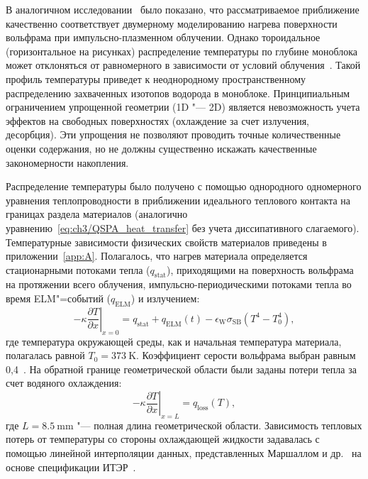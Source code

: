 В аналогичном исследовании~\cite{Dasgupta2023} было показано, что рассматриваемое приближение качественно соответствует двумерному моделированию нагрева поверхности вольфрама при импульсно-плазменном облучении. Однако тороидальное (горизонтальное на рисунках) распределение температуры по глубине моноблока может отклоняться от равномерного в зависимости от условий облучения~\cite{Delaporte-Mathurin2020, Delaporte-Mathurin2023}. Такой профиль температуры приведет к неоднородному пространственному распределению захваченных изотопов водорода в моноблоке. Принципиальным ограничением упрощенной геометрии (1D "--- 2D) является невозможность учета эффектов на свободных поверхностях (охлаждение за счет излучения, десорбция). Эти упрощения не позволяют проводить точные количественные оценки содержания, но не должны существенно искажать качественные закономерности накопления.

Распределение температуры было получено с помощью однородного одномерного уравнения теплопроводности в приближении идеального теплового контакта на границах раздела материалов (аналогично уравнению~\cref{eq:ch3/QSPA_heat_transfer} без учета диссипативного слагаемого). Температурные зависимости физических свойств материалов приведены в приложении~\cref{app:A}. Полагалось, что нагрев материала определяется стационарными потоками тепла (\( q_\mathrm{stat} \)), приходящими на поверхность вольфрама на протяжении всего облучения, импульсно-периодическими потоками тепла во время ELM"=событий (\( q_\mathrm{ELM} \)) и излучением:
\begin{equation}
	\label{eq:ch3/left_BC_ITER}
	\left.-\kappa\frac{\partial T}{\partial x}\right\vert_{x=0}=q_{\mathrm{stat}}+q_{\mathrm{ELM}}(t)-\epsilon_{\mathrm{W}}\sigma_\mathrm{SB}(T^4-T_0^4),
\end{equation}
где температура окружающей среды, как и начальная температура материала, полагалась равной \(T_0=\SI{373}{\kelvin}\). Коэффициент серости вольфрама выбран равным 0,4~\cite{weast1975crc}. На обратной границе геометрической области были заданы потери тепла за счет водяного охлаждения:
\begin{equation}
	\label{eq:ch3/right_BC_ITER}
	\left.-\kappa\frac{\partial T}{\partial x}\right\vert_{x=L}=q_{\mathrm{loss}}(T),
\end{equation}
где \( L=\SI{8.5}{\milli\meter} \) "--- полная длина геометрической области. Зависимость тепловых потерь от температуры со стороны охлаждающей жидкости задавалась с помощью линейной интерполяции данных, представленных Маршаллом и др.~\cite{Marshall2001} на основе спецификации ИТЭР~\cite{komarov2013thermal}.

